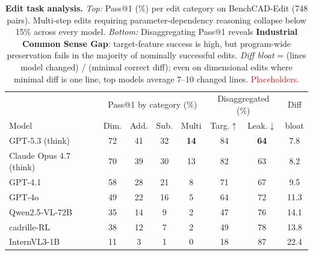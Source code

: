\begin{table}[t]
\centering
\small
\setlength{\tabcolsep}{4pt}
\caption{\textbf{Edit task analysis.} \emph{Top:} Pass@1 (\%) per edit category on BenchCAD-Edit (748 pairs). Multi-step edits requiring parameter-dependency reasoning collapse below 15\% across every model. \emph{Bottom:} Disaggregating Pass@1 reveals \textbf{Industrial Common Sense Gap}: target-feature success is high, but program-wide preservation fails in the majority of nominally successful edits. \emph{Diff bloat} = (lines model changed) / (minimal correct diff); even on dimensional edits where minimal diff is one line, top models average 7--10 changed lines. \textcolor{red}{Placeholders.}}
\label{tab:edit_leakage}
\begin{tabular}{lcccc|cc|c}
\toprule
        & \multicolumn{4}{c|}{Pass@1 by category (\%)} & \multicolumn{2}{c|}{Disaggregated (\%)} & Diff \\
Model   & Dim. & Add. & Sub. & Multi & Targ.$\uparrow$ & Leak.$\downarrow$ & bloat \\
\midrule
GPT-5.3 (think)               & 72 & 41 & 32 & \textbf{14} & 84 & \textbf{64} & 7.8 \\
Claude Opus 4.7 (think)     & 70 & 39 & 30 & 13 & 82 & 63 & 8.2 \\
GPT-4.1                     & 58 & 28 & 21 & 8  & 71 & 67 & 9.5 \\
GPT-4o                      & 49 & 22 & 16 & 5  & 64 & 72 & 11.3 \\
Qwen2.5-VL-72B              & 35 & 14 & 9  & 2  & 47 & 76 & 14.1 \\
cadrille-RL                 & 38 & 12 & 7  & 2  & 49 & 78 & 13.8 \\
InternVL3-1B                & 11 & 3  & 1  & 0  & 18 & 87 & 22.4 \\
\bottomrule
\end{tabular}
\end{table}
